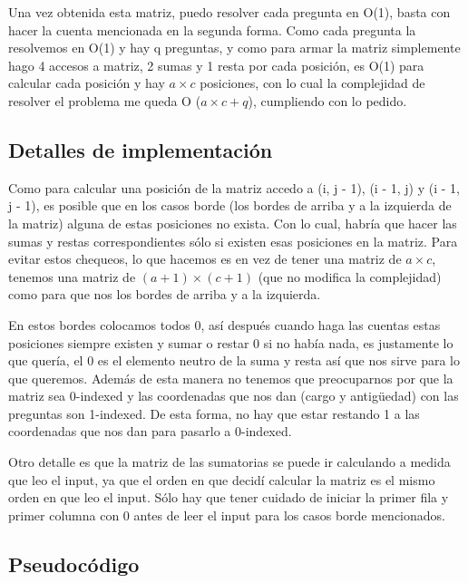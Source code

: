 Una vez obtenida esta matriz, puedo resolver cada pregunta en O(1), basta con hacer la cuenta mencionada en la segunda forma. Como cada pregunta la resolvemos en O(1) y hay q preguntas, y como para armar la matriz simplemente hago 4 accesos a matriz, 2 sumas y 1 resta por cada posición, es O(1) para calcular cada posición y hay $a \times c$ posiciones, con lo cual la complejidad de resolver el problema me queda O ($a \times c + q$), cumpliendo con lo pedido.

\subsection {Detalles de implementación}

Como para calcular una posición de la matriz accedo a (i, j - 1),  (i - 1, j) y (i - 1, j - 1), es posible que en los casos borde (los bordes de arriba y a la izquierda de la matriz) alguna de estas posiciones no exista. Con lo cual, habría que hacer las sumas y restas correspondientes sólo si existen esas posiciones en la matriz. Para evitar estos chequeos, lo que hacemos es en vez de tener una matriz de $a \times c$, tenemos una matriz de $(a + 1) \times (c + 1)$ (que no modifica la complejidad) como para que nos  los bordes de arriba y a la izquierda. \newline

En estos bordes colocamos todos 0, así después cuando haga las cuentas estas posiciones siempre existen y sumar o restar 0 si no había nada, es justamente lo que quería, el 0 es el elemento neutro de la suma y resta así que nos sirve para lo que queremos. Además de esta manera no tenemos que preocuparnos por que la matriz sea 0-indexed y las coordenadas que nos dan (cargo y antigüedad) con las preguntas son 1-indexed. De esta forma, no hay que estar restando 1 a las coordenadas que nos dan para pasarlo a 0-indexed.\newline

Otro detalle es que la matriz de las sumatorias se puede ir calculando a medida que leo el input, ya que el orden en que decidí calcular la matriz es el mismo orden en que leo el input. Sólo hay que tener cuidado de iniciar la primer fila y primer columna con 0 antes de leer el input para los casos borde mencionados.


\subsection {Pseudocódigo}

